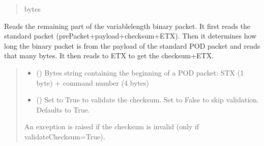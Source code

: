\documentclass[letterpaper,10pt,english]{sphinxmanual}
\begin{document}
\begin{fulllineitems}
\begin{fulllineitems}
\begin{quote}
\begin{description}
\sphinxAtStartPar
bytes

\end{description}\end{quote}

\end{fulllineitems}


\begin{fulllineitems}
\label{\detokenize{BasicPodProtocol:BasicPodProtocol.POD_Basics._Read_Binary}}
\pysigstartsignatures
{}
\pysigstopsignatures
\sphinxAtStartPar
Reads the remaining part of the variable\sphinxhyphen{}length binary packet. It first reads the standard         packet (prePacket+payload+checksum+ETX). Then it determines how long the binary packet is from the         payload of the standard POD packet and reads that many bytes. It then reads to ETX to get the         checksum+ETX.
\begin{quote}\begin{description}
\begin{itemize}
\item {} 
\sphinxAtStartPar
{} () \textendash{} Bytes string containing the beginning of a POD packet: STX (1 byte)                 + command number (4 bytes)

\item {} 
\sphinxAtStartPar
{} (\sphinxstyleliteralemphasis{\sphinxupquote{, }}) \textendash{} Set to True to validate the checksum. Set to False to                 skip validation. Defaults to True.

\end{itemize}

\sphinxAtStartPar
{} \textendash{} An exception is raised if the checksum is invalid (only if validateChecksum=True).


\end{description}
\end{quote}
\end{fulllineitems}
\end{fulllineitems}
\end{document}
